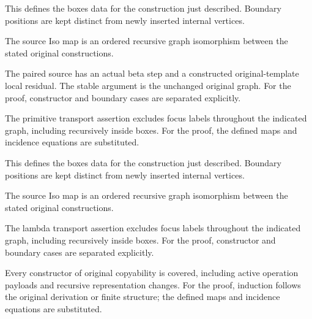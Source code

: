 This defines the boxes data for the construction just described. Boundary positions are kept distinct from newly inserted internal vertices.
\par{}

The source Iso map is an ordered recursive graph isomorphism between the stated original constructions.
\par{}

The paired source has an actual beta step and a constructed original-template local residual. The stable argument is the unchanged original graph.
For the proof, constructor and boundary cases are separated explicitly.
\par{}

The primitive transport assertion excludes focus labels throughout the indicated graph, including recursively inside boxes.
For the proof, the defined maps and incidence equations are substituted.
\par{}

This defines the boxes data for the construction just described. Boundary positions are kept distinct from newly inserted internal vertices.
\par{}

The source Iso map is an ordered recursive graph isomorphism between the stated original constructions.
\par{}

The lambda transport assertion excludes focus labels throughout the indicated graph, including recursively inside boxes.
For the proof, constructor and boundary cases are separated explicitly.
\par{}

Every constructor of original copyability is covered, including active operation payloads and recursive representation changes.
For the proof, induction follows the original derivation or finite structure; the defined maps and incidence equations are substituted.
\par{}

